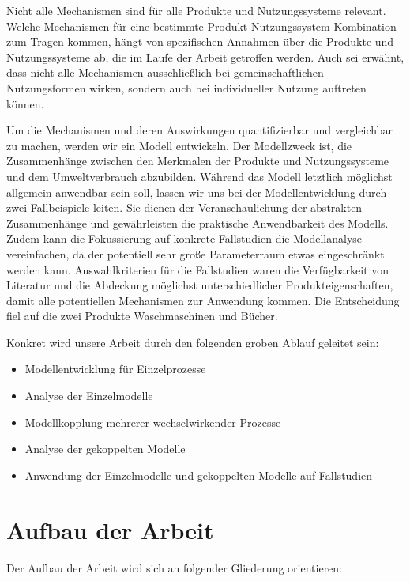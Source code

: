 \documentclass[11pt, titlepage=true]{scrartcl} %
\begin{document}
Nicht alle Mechanismen sind für alle Produkte und Nutzungssysteme relevant. Welche Mechanismen für eine bestimmte Produkt-Nutzungssystem-Kombination zum Tragen kommen, hängt von spezifischen Annahmen über die Produkte und Nutzungssysteme ab, die im Laufe der Arbeit getroffen werden. Auch sei erwähnt, dass nicht alle Mechanismen ausschließlich bei gemeinschaftlichen Nutzungsformen wirken, sondern auch bei individueller Nutzung auftreten können.

Um die Mechanismen und deren Auswirkungen quantifizierbar und vergleichbar zu machen, werden wir ein Modell entwickeln. Der Modellzweck ist, die Zusammenhänge zwischen den Merkmalen der Produkte und Nutzungssysteme und dem Umweltverbrauch abzubilden. Während das Modell letztlich möglichst allgemein anwendbar sein soll, lassen wir uns bei der Modellentwicklung durch zwei Fallbeispiele leiten. Sie dienen der Veranschaulichung der abstrakten Zusammenhänge und gewährleisten die praktische Anwendbarkeit des Modells. Zudem kann die Fokussierung auf konkrete Fallstudien die Modellanalyse vereinfachen, da der potentiell sehr große Parameterraum etwas eingeschränkt werden kann. Auswahlkriterien für die Fallstudien waren die Verfügbarkeit von Literatur und die Abdeckung möglichst unterschiedlicher Produkteigenschaften, damit alle potentiellen Mechanismen zur Anwendung kommen. Die Entscheidung fiel auf die zwei Produkte Waschmaschinen und Bücher.

Konkret wird unsere Arbeit durch den folgenden groben Ablauf geleitet sein:
\begin{itemize}
	\item Modellentwicklung für Einzelprozesse
	\item Analyse der Einzelmodelle
	\item Modellkopplung mehrerer wechselwirkender Prozesse
	\item Analyse der gekoppelten Modelle
	\item Anwendung der Einzelmodelle und gekoppelten Modelle auf Fallstudien
\end{itemize}

\section{Aufbau der Arbeit}
Der Aufbau der Arbeit wird sich an folgender Gliederung orientieren:
\end{document}
